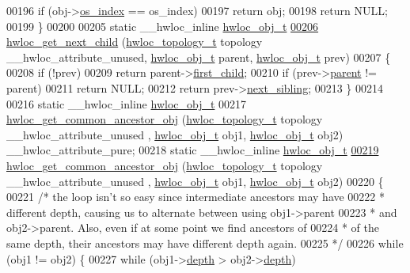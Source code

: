 \begin{DoxyCode}
00196     \textcolor{keywordflow}{if} (obj->\hyperlink{a00016_a61a7a80a68eaccbaaa28269e678c81a9}{os_index} == os\_index)
00197       \textcolor{keywordflow}{return} obj;
00198   \textcolor{keywordflow}{return} NULL;
00199 \}
00200 
00205 \textcolor{keyword}{static} \_\_hwloc\_inline \hyperlink{a00016}{hwloc_obj_t}
\hypertarget{a00031_source_l00206}{}\hyperlink{a00053_gae5ef1af636849f77714e1584ba78cf9c}{00206} \hyperlink{a00053_gae5ef1af636849f77714e1584ba78cf9c}{hwloc_get_next_child} (\hyperlink{a00039_ga9d1e76ee15a7dee158b786c30b6a6e38}{hwloc_topology_t} topology \_\_hwloc\_attribute\_unused, 
      \hyperlink{a00016}{hwloc_obj_t} parent, \hyperlink{a00016}{hwloc_obj_t} prev)
00207 \{
00208   \textcolor{keywordflow}{if} (!prev)
00209     \textcolor{keywordflow}{return} parent->\hyperlink{a00016_af51d08a0a79dba517c06c5afedc8d2dc}{first_child};
00210   \textcolor{keywordflow}{if} (prev->\hyperlink{a00016_adc494f6aed939992be1c55cca5822900}{parent} != parent)
00211     \textcolor{keywordflow}{return} NULL;
00212   \textcolor{keywordflow}{return} prev->\hyperlink{a00016_a7f2343ed476fe4942e6fffd4cade1b40}{next_sibling};
00213 \}
00214 
00216 \textcolor{keyword}{static} \_\_hwloc\_inline \hyperlink{a00016}{hwloc_obj_t}
00217 \hyperlink{a00053_ga52a334f17c6b5b409d5cc6bb4ab8a2ab}{hwloc_get_common_ancestor_obj} (\hyperlink{a00039_ga9d1e76ee15a7dee158b786c30b6a6e38}{hwloc_topology_t} topology \_\_hwloc\_attribute\_unused
      , \hyperlink{a00016}{hwloc_obj_t} obj1, \hyperlink{a00016}{hwloc_obj_t} obj2) \_\_hwloc\_attribute\_pure;
00218 \textcolor{keyword}{static} \_\_hwloc\_inline \hyperlink{a00016}{hwloc_obj_t}
\hypertarget{a00031_source_l00219}{}\hyperlink{a00053_ga52a334f17c6b5b409d5cc6bb4ab8a2ab}{00219} \hyperlink{a00053_ga52a334f17c6b5b409d5cc6bb4ab8a2ab}{hwloc_get_common_ancestor_obj} (\hyperlink{a00039_ga9d1e76ee15a7dee158b786c30b6a6e38}{hwloc_topology_t} topology \_\_hwloc\_attribute\_unused
      , \hyperlink{a00016}{hwloc_obj_t} obj1, \hyperlink{a00016}{hwloc_obj_t} obj2)
00220 \{
00221   \textcolor{comment}{/* the loop isn't so easy since intermediate ancestors may have}
00222 \textcolor{comment}{   * different depth, causing us to alternate between using obj1->parent}
00223 \textcolor{comment}{   * and obj2->parent. Also, even if at some point we find ancestors of}
00224 \textcolor{comment}{   * of the same depth, their ancestors may have different depth again.}
00225 \textcolor{comment}{   */}
00226   \textcolor{keywordflow}{while} (obj1 != obj2) \{
00227     \textcolor{keywordflow}{while} (obj1->\hyperlink{a00016_a9d82690370275d42d652eccdea5d3ee5}{depth} > obj2->\hyperlink{a00016_a9d82690370275d42d652eccdea5d3ee5}{depth})

\end{DoxyCode}
